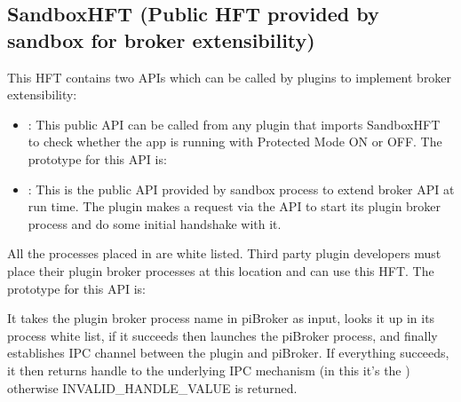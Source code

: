 \documentclass[letterpaper,12pt,english,openany,oneside]{sphinxmanual}
\begin{document}
\subsection{SandboxHFT (Public HFT provided by sandbox for broker extensibility)}
\label{\detokenize{SandboxBrokerExt:sandboxhft-public-hft-provided-by-sandbox-for-broker-extensibility}}
This HFT contains two APIs which can be called by plug\sphinxhyphen{}ins to implement broker extensibility:
\begin{itemize}
\item {} 
 : This public API can be called from any plug\sphinxhyphen{}in that imports SandboxHFT to check whether the app is running with Protected Mode ON or OFF.
The prototype for this API is:

\item {} 
 : This is the public API provided by sandbox process to extend broker API at run time. The plug\sphinxhyphen{}in makes a request via the  API to start its plugin broker process and do some initial handshake with it.

\end{itemize}

All the processes placed in  are white listed. Third party plug\sphinxhyphen{}in developers must place their plugin broker processes at this location and can use this HFT. The prototype for this API is:

\begin{sphinxVerbatim}[commandchars=\\\{\}]
 
       
\end{sphinxVerbatim}

It takes the plugin broker process name in piBroker as input, looks it up in its process white list, if it succeeds then launches the piBroker process, and finally establishes IPC channel between the plug\sphinxhyphen{}in and piBroker. If everything succeeds, it then returns handle to the underlying IPC mechanism (in this it’s the  ) otherwise INVALID\_HANDLE\_VALUE is returned.
\end{document}

